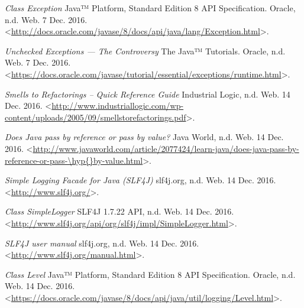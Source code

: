 \begin{thebibliography}{21}
\textit{Class Exception} Java™ Platform, Standard Edition 8
API Specification. Oracle, n.d. Web. 7 Dec. 2016. <\url{http://docs.oracle.com/javase/8/docs/api/java/lang/Exception.html}>.


\textit{Unchecked Exceptions — The Controversy} The Java™ Tutorials. Oracle, n.d. Web. 7 Dec. 2016. <\url{https://docs.oracle.com/javase/tutorial/essential/exceptions/runtime.html}>.



\textit{Smells to Refactorings -- Quick Reference Guide} Industrial Logic, n.d. Web. 14 Dec. 2016. <\url{http://www.industriallogic.com/wp-content/uploads/2005/09/smellstorefactorings.pdf}>.


\textit{Does Java pass by reference or pass by value?} Java World, n.d. Web. 14 Dec. 2016. <\url{http://www.javaworld.com/article/2077424/learn-java/does-java-pass-by-reference-or-pass-\hyp{}by-value.html}>.



\textit{Simple Logging Facade for Java (SLF4J)} slf4j.org, n.d. Web. 14 Dec. 2016. <\url{http://www.slf4j.org/}>.


\textit{Class SimpleLogger} SLF4J 1.7.22 API, n.d. Web. 14 Dec. 2016. <\url{http://www.slf4j.org/api/org/slf4j/impl/SimpleLogger.html}>.


\textit{SLF4J user manual} slf4j.org, n.d. Web. 14 Dec. 2016. <\url{http://www.slf4j.org/manual.html}>.


\textit{Class Level} Java™ Platform, Standard Edition 8
API Specification. Oracle, n.d. Web. 14 Dec. 2016. <\url{https://docs.oracle.com/javase/8/docs/api/java/util/logging/Level.html}>.

\end{thebibliography}
